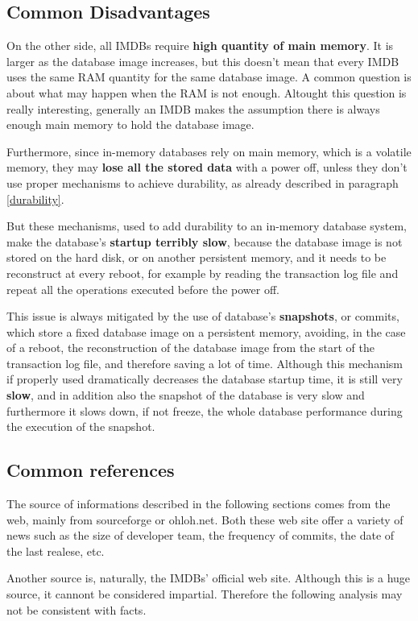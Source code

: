 	\subsection{Common Disadvantages}
	On the other side, all IMDBs require \textbf{high quantity of main memory}. It is larger as the database image increases, 
	but this doesn't mean that every IMDB uses the same RAM quantity for the same database image. A common question 
	is about what may happen when the RAM is not enough. Altought this question is really interesting, generally 
	an IMDB makes the assumption there is always enough main memory to hold the database image.
	
	Furthermore, since in-memory databases rely on main memory, which is a volatile memory, they may \textbf{lose all the stored data} with a power off, unless they don't use proper mechanisms to achieve durability, as already described in paragraph \ref{durability}. 
	
	But these mechanisms, used to add durability to an in-memory database system, make the database's \textbf{startup terribly slow}, because the database image is not stored on the hard disk, or on another persistent memory, and it needs to be reconstruct at every reboot, for example by reading the transaction log file and repeat all the operations executed before the power off.
	
	This issue is always mitigated by the use of database's \textbf{snapshots}, or commits, which store a fixed database image on a persistent memory, avoiding, in the case of a reboot, the reconstruction of the database image from the start of the transaction log file, and therefore saving a lot of time. Although this mechanism if properly used dramatically decreases the database startup time, it is still very \textbf{slow}, and in addition also the snapshot of the database is very slow and furthermore it slows down, if not freeze, the whole database performance during the execution of the snapshot.
	
	\subsection{Common references}
	The source of informations described in the following sections comes from the web, 
	mainly from sourceforge or 
	ohloh.net. Both these web site offer a variety of news such as the size of developer team, the frequency of 
	commits, the date of the last realese, etc. 
	
	Another source is, naturally, the IMDBs' official web site. Although this is a huge source, it 
	cannont be considered impartial. Therefore the following analysis may not be consistent with facts. 
		
